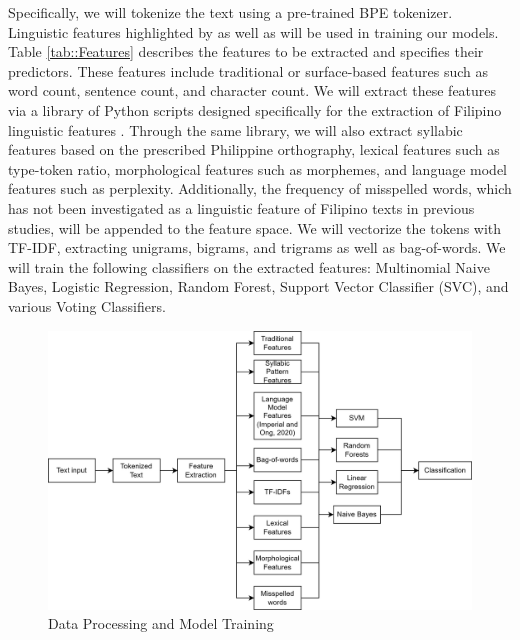 Specifically, we will tokenize the text using a pre-trained BPE tokenizer. Linguistic features highlighted by  as well as  will be used in training our models. Table \ref{tab::Features} describes the features to be extracted and specifies their predictors. These features include traditional or surface-based  features such as word count, sentence count, and character count. We will extract these features via a library of Python scripts designed specifically for the extraction of Filipino linguistic features \cite{imperial-2020, imperial-2021}. Through the same library, we will also extract syllabic features based on the prescribed Philippine orthography, lexical features such as type-token ratio, morphological features such as morphemes, and language model features such as perplexity. Additionally, the frequency of misspelled words, which has not been investigated as a linguistic feature of Filipino texts in previous studies, will be appended to the feature space. We will vectorize the tokens with TF-IDF, extracting unigrams, bigrams, and trigrams as well as bag-of-words. We will train the following classifiers on the extracted features: Multinomial Naive Bayes, Logistic Regression, Random Forest, Support Vector Classifier (SVC), and various Voting Classifiers.

\begin{figure}[h]
\includegraphics[width=\textwidth,height=\textheight,keepaspectratio]{figures/Model Training.png}
  \caption{Data Processing and Model Training}
  \label{fig:Model}
\end{figure}

\clearpage

